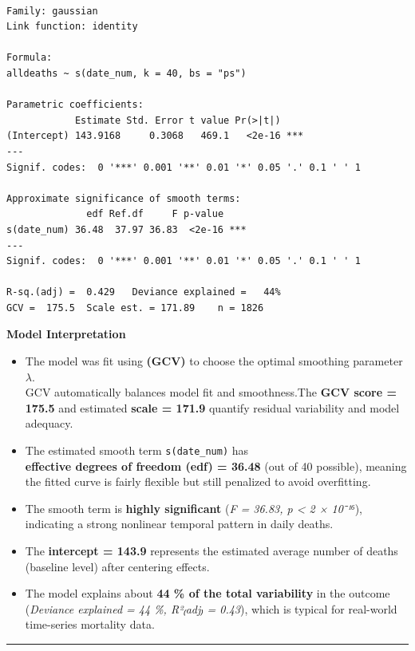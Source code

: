 \documentclass[
  letterpaper,
  DIV=11,
  numbers=noendperiod]{scrreprt}
\begin{document}
\begin{verbatim}

Family: gaussian 
Link function: identity 

Formula:
alldeaths ~ s(date_num, k = 40, bs = "ps")

Parametric coefficients:
            Estimate Std. Error t value Pr(>|t|)    
(Intercept) 143.9168     0.3068   469.1   <2e-16 ***
---
Signif. codes:  0 '***' 0.001 '**' 0.01 '*' 0.05 '.' 0.1 ' ' 1

Approximate significance of smooth terms:
              edf Ref.df     F p-value    
s(date_num) 36.48  37.97 36.83  <2e-16 ***
---
Signif. codes:  0 '***' 0.001 '**' 0.01 '*' 0.05 '.' 0.1 ' ' 1

R-sq.(adj) =  0.429   Deviance explained =   44%
GCV =  175.5  Scale est. = 171.89    n = 1826
\end{verbatim}

\textbf{Model Interpretation}

\begin{itemize}
\item
  The model was fit using \textbf{(GCV)} to choose the optimal smoothing
  parameter \(\lambda\).\\
  GCV automatically balances model fit and smoothness.The \textbf{GCV
  score = 175.5} and estimated \textbf{scale = 171.9} quantify residual
  variability and model adequacy.
\item
  The estimated smooth term \texttt{s(date\_num)} has\\
  \textbf{effective degrees of freedom (edf) = 36.48} (out of 40
  possible), meaning the fitted curve is fairly flexible but still
  penalized to avoid overfitting.
\item
  The smooth term is \textbf{highly significant} (\emph{F = 36.83, p
  \textless{} 2 × 10⁻¹⁶}), indicating a strong nonlinear temporal
  pattern in daily deaths.
\item
  The \textbf{intercept = 143.9} represents the estimated average number
  of deaths (baseline level) after centering effects.
\item
  The model explains about \textbf{44 \% of the total variability} in
  the outcome\\
  (\emph{Deviance explained = 44 \%, R²₍adj₎ = 0.43}), which is typical
  for real-world time-series mortality data.
\end{itemize}

\begin{center}\rule{0.5\linewidth}{0.5pt}\end{center}
\end{document}
